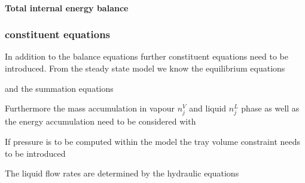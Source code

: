     \paragraph{Total internal energy balance}

\subsubsection{constituent equations}
    In addition to the balance equations further constituent equations need to be introduced. From the
    steady state model we know the equilibrium equations

    and the summation equations


    Furthermore the mass accumulation in vapour $n_j^V$ and liquid $n_j^L$ phase as well as the energy accumulation
    need to be considered with


    If pressure is to be computed within the model the tray volume constraint needs to
    be introduced


    The liquid flow rates are determined by the hydraulic equations

